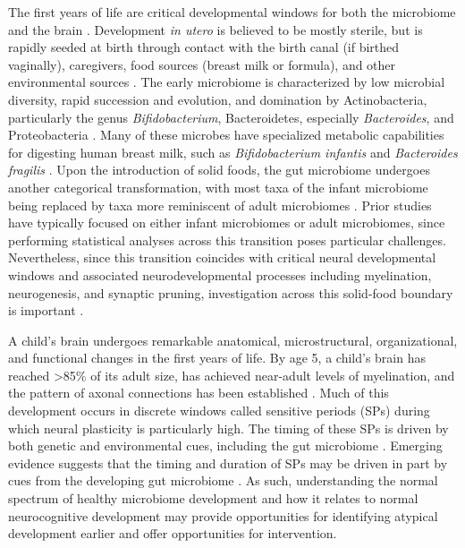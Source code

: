 \documentclass{article}
\begin{document}
The first years of life are critical developmental windows for both the
microbiome and the brain
\cite{laueDevelopingMicrobiomeBirth2022}.
Development \emph{in utero} is believed to be mostly sterile, but
is rapidly seeded at birth through contact with the birth canal (if
birthed vaginally), caregivers, food sources (breast milk or formula),
and other environmental sources
\cite{backhedDynamicsStabilizationHuman2015,bokulichAntibioticsBirthMode2016}.
The early microbiome is characterized by low microbial
diversity, rapid succession and evolution, and domination by
Actinobacteria, particularly the genus \emph{Bifidobacterium},
Bacteroidetes, especially \emph{Bacteroides}, and Proteobacteria
\cite{koenigSuccessionMicrobialConsortia2011}.
Many of these microbes have specialized metabolic capabilities
for digesting human breast milk, such as \emph{Bifidobacterium infantis}
and \emph{Bacteroides fragilis}
\cite{selaGenomeSequenceBifidobacterium2008}.
Upon the introduction of solid foods, the gut
microbiome undergoes another categorical transformation, with most taxa
of the infant microbiome being replaced by taxa more reminiscent of
adult microbiomes
\cite{backhedDynamicsStabilizationHuman2015}.
Prior studies have typically focused on either infant microbiomes or
adult microbiomes, since performing statistical analyses across this
transition poses particular challenges. Nevertheless, since this
transition coincides with critical neural developmental windows and
associated neurodevelopmental processes including myelination, neurogenesis, and synaptic pruning,
investigation across this solid-food boundary is important
\cite{tauNormalDevelopmentBrain2010}.

A child's brain undergoes remarkable anatomical, microstructural,
organizational, and functional changes in the first years of life. By
age 5, a child's brain has reached \textgreater85\% of its adult size,
has achieved near-adult levels of myelination, and the pattern of axonal
connections has been established
\cite{silbereisCellularMolecularLandscapes2016}.
Much of this development occurs in discrete windows called
sensitive periods (SPs)
\cite{knudsenSensitivePeriodsDevelopment2004}
during which neural plasticity is particularly high. The timing of these SPs
is driven by both genetic and environmental cues, including the gut microbiome
\cite{cowanAnnualResearchReview2020}.
Emerging evidence suggests that the timing and duration of SPs
may be driven in part by cues from the developing gut microbiome
\cite{callaghanNestedSensitivePeriods2020}.
As such,
understanding the normal spectrum of healthy microbiome
development and how it relates to normal neurocognitive development may
provide opportunities for identifying atypical development earlier and
offer opportunities for intervention.
\end{document}
